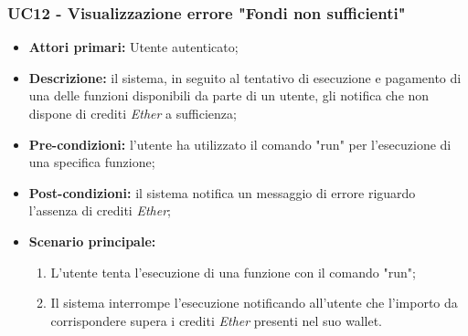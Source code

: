\subsubsection{UC12 - Visualizzazione errore "Fondi non sufficienti"}
\begin{itemize}
	\item \textbf{Attori primari:} Utente autenticato;
	\item \textbf{Descrizione:} il sistema, in seguito al tentativo di esecuzione e pagamento di una delle funzioni disponibili da parte di un utente, gli notifica che non dispone di crediti \textit{Ether\glo} a sufficienza; 
	\item \textbf{Pre-condizioni:} l'utente ha utilizzato il comando "run" per l'esecuzione di una specifica funzione;
	\item \textbf{Post-condizioni:} il sistema notifica un messaggio di errore riguardo l'assenza di crediti \textit{Ether\glos};
	\item \textbf{Scenario principale:} 
	\begin{enumerate}
		\item L'utente tenta l'esecuzione di una funzione con il comando "run";
		\item Il sistema interrompe l'esecuzione notificando all'utente che l'importo da corrispondere supera i crediti \textit{Ether\glo} presenti nel suo wallet.
	\end{enumerate}
\end{itemize}